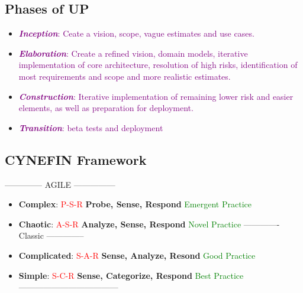 \documentclass[main.tex,fontsize=12pt,paper=a4,paper=landscape,DIV=calc,]{scrartcl}
\begin{document}
\begin{multicols*}{2}
\subsection{Phases of UP}
\begin{itemize}
  \item \textcolor{purple}{\textbf{\emph{Inception}}: Ceate a vision, scope, vague estimates and use cases.}
   \item \textcolor{purple}{\textbf{\emph{Elaboration}}: Create a refined vision, domain models, iterative implementation of core architecture, resolution of high risks, identification of most requirements and scope and more realistic estimates.}
   \item \textcolor{purple}{\textbf{\emph{Construction}}: Iterative implementation of remaining lower risk and easier elements, as well as preparation for deployment.}
   \item \textcolor{purple}{\textbf{\emph{Transition}}: beta tests and deployment}
\end{itemize} 

\subsection{CYNEFIN Framework}
  -------------- AGILE ---------------\newline
\begin{itemize}
  \item \textbf{Complex}: \textcolor{red}{P-S-R}\newline
\textbf{Probe, Sense, Respond}\newline
\textcolor{green}{Emergent Practice}
\item \textbf{Chaotic}: \textcolor{red}{A-S-R}\newline
\textbf{Analyze, Sense, Respond}\newline
\textcolor{green}{Novel Practice}\newline
  ------------- Classic --------------\newline
\item \textbf{Complicated}: \textcolor{red}{S-A-R}\newline
\textbf{Sense, Analyze, Resond}\newline
\textcolor{green}{Good Practice}
\item \textbf{Simple}:
\textcolor{red}{S-C-R}\newline
\textbf{Sense, Categorize, Respond}\newline
\textcolor{green}{Best Practice}\newline
  ------------------------------------
\end{itemize} 


\end{multicols*}
\end{document}

